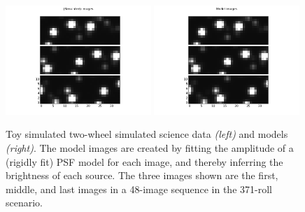 \documentclass[letterpaper,12pt,whitepaper]{haastex}
\begin{document}
\begin{figure}
\includegraphics[trim=0.75in 0.5in 0.75in 0.5in, width=0.49\textwidth]{sim-103.png}%
\includegraphics[trim=0.75in 0.5in 0.75in 0.5in, width=0.49\textwidth]{sim-104.png}
\caption{Toy simulated two-wheel simulated science data \textsl{(left)} and models \textsl{(right)}.
The model images are created by fitting the amplitude of a (rigidly fit) PSF model for each image,
  and thereby inferring the brightness of each source.
The three images shown are the first, middle, and last images
  in a 48-image sequence in the 371-roll scenario.\label{fig:toydata}}
\end{figure}
\end{document}
